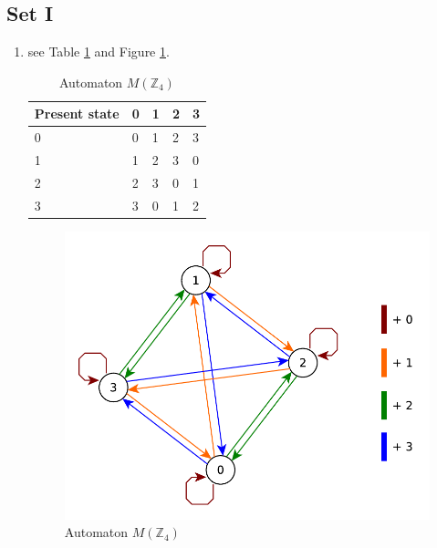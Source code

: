 \subsection{Set I}
\begin{enumerate}
    \item see Table \ref{tab:automaton-mz4} and Figure \ref{fig:automaton-mz4}.
    
    \begin{table}[]
        \centering
        \begin{tabular}{l|llll}
        Present state & 0 & 1 & 2 & 3 \\ \hline
        0             & 0 & 1 & 2 & 3 \\
        1             & 1 & 2 & 3 & 0 \\
        2             & 2 & 3 & 0 & 1 \\
        3             & 3 & 0 & 1 & 2
        \end{tabular}
        \caption{Automaton $M(\mathbb{Z}_4)$}
        \label{tab:automaton-mz4}
    \end{table}
    \begin{figure}
        \centering
        \includegraphics[scale=0.5]{diagrams/automaton-mz4.pdf}
        \caption{Automaton $M(\mathbb{Z}_4)$}
        \label{fig:automaton-mz4}        
    \end{figure}


\end{enumerate}
